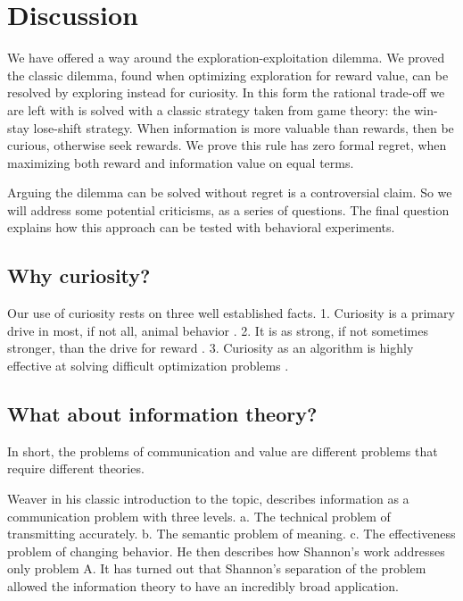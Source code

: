 \section*{Discussion}
We have offered a way around the exploration-exploitation dilemma. We proved the classic dilemma, found when optimizing exploration for reward value, can be resolved by exploring instead for curiosity. In this form the rational trade-off we are left with is solved with a classic strategy taken from game theory: the win-stay lose-shift strategy. When information is more valuable than rewards, then be curious, otherwise seek rewards. We prove this rule has zero formal regret, when maximizing both reward and information value on equal terms.

Arguing the dilemma can be solved without regret is a controversial claim. So we will address some potential criticisms, as a series of questions. The final question explains how this approach can be tested with behavioral experiments. 

\subsection*{Why curiosity?}
Our use of curiosity rests on three well established facts. 1. Curiosity is a primary drive in most, if not all, animal behavior \cite{Inglis2001}. 2. It is as strong, if not sometimes stronger, than the drive for reward \cite{Loewenstein1994,Kidd2015,Gottlieb2018}. 3. Curiosity as an algorithm is highly effective at solving difficult optimization problems \cite{Schmidhuber1991,Pathak2017,Stanton2018,Fister2019,Mouret2015,Colas2020,Cully2015,Pathak2017,Schwartenbeck2019,Laversanne-Finot2018}. 


\subsection*{What about information theory?}
In short, the problems of communication and value are different problems that require different theories.

Weaver \cite{Shannon1964} in his classic introduction to the topic, describes information as a communication problem with three levels. a. The technical problem of transmitting accurately. b. The semantic problem of meaning. c. The effectiveness problem of changing behavior. He then describes how Shannon's work addresses only problem A. It has turned out that Shannon's separation of the problem allowed the information theory to have an incredibly broad application. 


